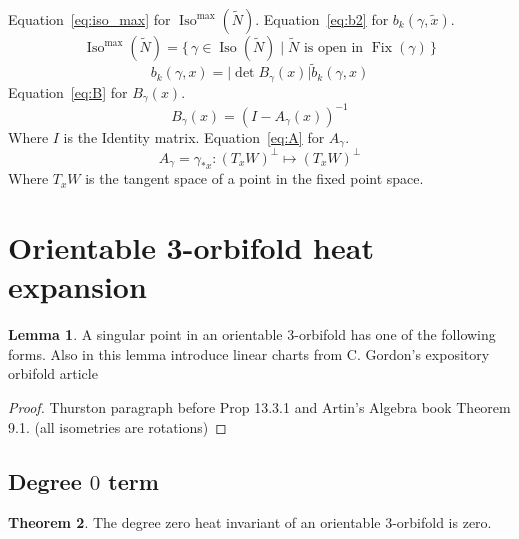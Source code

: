 \documentclass[12pt]{article}
\newcommand{\myabs}[1]{\vert#1\vert}
\theoremstyle{definition}
\newtheorem{theorem}{Theorem}[section]
\newtheorem{lemma}[theorem]{Lemma}
\DeclareMathOperator{\iso}{Iso}
\DeclareMathOperator{\fix}{Fix}
\begin{document}
Equation~\ref{eq:iso_max} for $\iso^{\max}(\tilde{N})$. Equation~\ref{eq:b2} for $b_k(\gamma,\tilde{x})$.
\begin{equation}
    \iso^{\max}(\tilde{N}) = \{\, \gamma \in \iso(\tilde{N}) \mid \tilde{N} \text{ is open in } \fix(\gamma) \,\}
    \label{eq:iso_max}
\end{equation}
\begin{equation}
b_k(\gamma,x)=\myabs{\det{B_{\gamma}(x)}}\tilde{b}_k(\gamma,x)
\label{eq:b2}
\end{equation}
Equation~\ref{eq:B} for $B_{\gamma}(x)$. 
\begin{equation}
    B_{\gamma}(x)={(I-A_{\gamma}(x))}^{-1}
    \label{eq:B}
\end{equation}
Where $I$ is the Identity matrix. Equation~\ref{eq:A} for $A_{\gamma}$.
\begin{equation}
    A_{\gamma} = \gamma_{\ast x}: {(T_{x}W)}^{\perp} \mapsto {(T_{x}W)}^{\perp}
    \label{eq:A}
\end{equation}
Where $T_{x}W$ is the tangent space of a point in the fixed point space.


\section{Orientable 3-orbifold heat expansion}

\begin{lemma}\label{lem:sing}  A singular point in an orientable 3-orbifold has one of the following forms.  Also in this lemma introduce linear charts from C. Gordon's expository orbifold article
\end{lemma}

\begin{proof}Thurston paragraph before Prop 13.3.1 and Artin's Algebra book Theorem 9.1.  (all isometries are rotations)
\end{proof}

\subsection{Degree $0$ term}

\begin{theorem}  The degree zero heat invariant of an orientable $3$-orbifold is zero.
\end{theorem}
\end{document}
